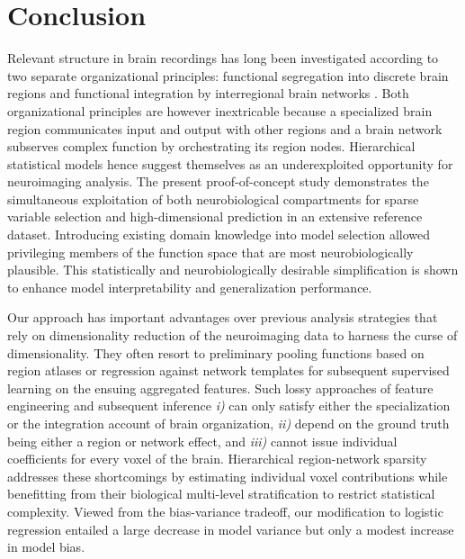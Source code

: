\documentclass[runningheads,a4paper]{llncs}
\begin{document}
\section{Conclusion}
Relevant structure in brain recordings has long been investigated
according to two separate organizational principles:
functional segregation into discrete brain regions
\cite{passingham2002}
and functional integration by interregional brain networks
\cite{sporns14nn}.
Both organizational principles are however inextricable because
a specialized brain region communicates input and output with other regions
and a brain network subserves complex function by
orchestrating its region nodes.
Hierarchical statistical models hence suggest themselves
as an underexploited opportunity for neuroimaging analysis.
%
The present proof-of-concept study demonstrates the simultaneous exploitation of
both neurobiological compartments
for sparse variable selection and high-dimensional prediction
in an extensive reference dataset.
%
Introducing existing domain knowledge into model selection
allowed privileging members of the function space
that are most neurobiologically plausible.
%
This statistically and neurobiologically desirable simplification
is shown to enhance
model interpretability and generalization performance.

Our approach has important advantages over previous
analysis strategies that rely on dimensionality reduction of
the neuroimaging data to harness the curse of dimensionality.
They often resort to preliminary pooling functions based on region atlases
or regression against network templates
for subsequent supervised learning on the ensuing aggregated features.
Such lossy approaches of
feature engineering and subsequent inference
\textit{i)} can only satisfy either the specialization or
the integration account of brain organization,
\textit{ii)} depend on the ground truth being either a region or network effect,
and
\textit{iii)} cannot issue individual coefficients for every voxel of the brain.
%
Hierarchical region-network sparsity addresses these shortcomings
by estimating individual voxel contributions
while benefitting from their biological multi-level stratification
to restrict statistical complexity.
%
Viewed from the bias-variance tradeoff,
our modification to logistic regression
entailed a large decrease in model variance but only a modest
increase in model bias.
\end{document}
